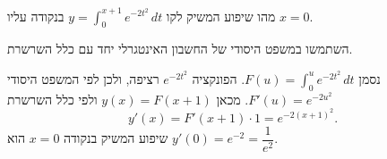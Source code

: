 
\begin{question}
מהו שיפוע המשיק לקו $y=\int_0^{x+1}e^{-2t^2}\,dt$ בנקודה עליו $x=0$.
\end{question}

\begin{hint}
השתמשו במשפט היסודי של החשבון האינטגרלי יחד עם כלל השרשרת.
\end{hint}

\begin{solution}
נסמן $F(u)=\int_0^u e^{-2t^2}\,dt$. הפונקציה $e^{-2t^2}$ רציפה, ולכן לפי המשפט היסודי $F'(u)=e^{-2u^2}$. מכאן $y(x)=F(x+1)$ ולפי כלל השרשרת
\[ y'(x)=F'(x+1)\cdot 1=e^{-2(x+1)^2}. \]
שיפוע המשיק בנקודה $x=0$ הוא $y'(0)=e^{-2}=\dfrac{1}{e^2}$.
\end{solution}
